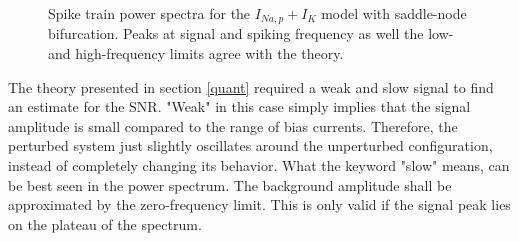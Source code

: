 \documentclass[12pt,a4paper]{article}
\begin{document}
\begin{figure}[H]
	\label{snspec}
	\hspace*{-0.5cm}
	\caption{Spike train power spectra for the $I_{Na,p}+I_K$ model with saddle-node bifurcation. Peaks at signal and spiking frequency as well the low- and high-frequency limits agree with the theory.}
\end{figure}
The theory presented in section \ref{quant} required a weak and slow signal to find an estimate for the SNR. "Weak" in this case simply implies that the signal amplitude is small compared to the range of bias currents. Therefore, the perturbed system just slightly oscillates around the unperturbed configuration, instead of completely changing its behavior. What the keyword "slow" means, can be best seen in the power spectrum. The background amplitude shall be approximated by the zero-frequency limit. This is only valid if the signal peak lies on the plateau of the spectrum.\\
\end{document}
